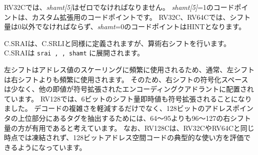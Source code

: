 \begin{comment}
For RV32C, {\em shamt[5]} must be zero; the code points with {\em shamt[5]}=1
are designated for custom extensions.  For RV32C and RV64C, the shift
amount must be non-zero; the code points with {\em shamt}=0 are HINTs.
\end{comment}
RV32Cでは、{\em shamt[5]}はゼロでなければなりません。
{\em shamt[5]}=1のコードポイントは、カスタム拡張用のコードポイントです。
RV32C、RV64Cでは、シフト量は0以外でなければならず、{\em shamt}=0のコードポイントはHINTとなります。

\begin{comment}
C.SRAI is defined analogously to C.SRLI, but instead performs an arithmetic
right shift.
C.SRAI expands to {\tt srai \rdprime, \rdprime, shamt}.
\end{comment}
C.SRAIは、C.SRLIと同様に定義されますが、算術右シフトを行います。
C.SRAIは {\tt srai \rdprime, \rdprime, shamt} に展開されます。

\begin{commentary}
\begin{comment}
Left shifts are usually more frequent than right shifts, as left
shifts are frequently used to scale address values.  Right shifts have
therefore been granted less encoding space and are placed in an
encoding quadrant where all other immediates are sign-extended.  For
RV128, the decision was made to have the 6-bit shift-amount immediate
also be sign-extended.  Apart from reducing the decode complexity, we
believe right-shift amounts of 96--127 will be more useful than 64--95,
to allow extraction of tags located in the high portions of 128-bit
address pointers.  We note that RV128C will not be frozen at the same
point as RV32C and RV64C, to allow evaluation of typical usage of
128-bit address-space codes.
\end{comment}
左シフトはアドレス値のスケーリングに頻繁に使用されるため、通常、左シフトは右シフトよりも頻繁に使用されます。
そのため、右シフトの符号化スペースは少なく、他の即値が符号拡張されたエンコーディングクアドラントに配置されています。
RV128では、6ビットのシフト量即時値も符号拡張されることになりました。
デコードの複雑さを軽減するだけでなく、128ビットのアドレスポインタの上位部分にあるタグを抽出するためには、64～95よりも96～127の右シフト量の方が有用であると考えています。
なお、RV128Cは、RV32CやRV64Cと同じ時点では凍結されず、128ビットアドレス空間コードの典型的な使い方を評価できるようになっています。
\end{commentary}

